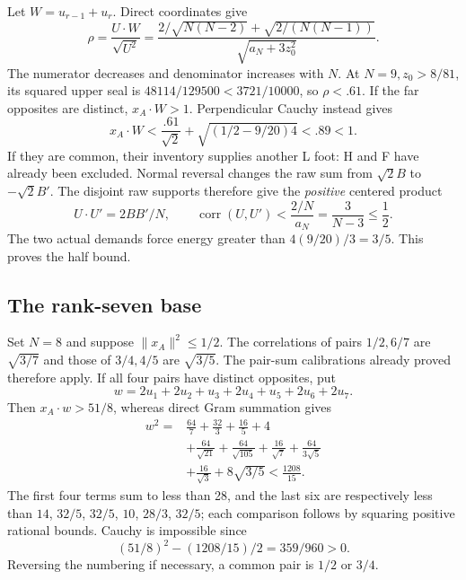 \documentclass[11pt]{article}
\theoremstyle{definition}
\theoremstyle{remark}
\begin{document}
Let \(W=u_{r-1}+u_r\). Direct coordinates give
\begin{equation}\label{app:eq:rho}
 \rho=\frac{U\cdot W}{\sqrt{U^2}}
 =\frac{2/\sqrt{N(N-2)}+\sqrt{2/(N(N-1))}}
        {\sqrt{a_N+3z_0^2}} .
\end{equation}
The numerator decreases and denominator increases with \(N\).
At \(N=9,z_0>8/81\), its squared upper seal is
\(48114/129500<3721/10000\), so \(\rho<.61\).
If the far opposites are distinct, \(x_A\cdot W>1\).
Perpendicular Cauchy instead gives
\[
 x_A\cdot W<\frac{.61}{\sqrt2}
              +\sqrt{(1/2-9/20)4}<.89<1.
\]
If they are common, their inventory supplies another L foot:
H and F have already been excluded. Normal reversal changes
the raw sum from \(\sqrt2 B\) to \(-\sqrt2 B'\).
The disjoint raw supports therefore give the \emph{positive}
centered product
\[
 U\cdot U'=2BB'/N,\qquad
 \operatorname{corr}(U,U')<\frac{2/N}{a_N}
                 =\frac3{N-3}\le\frac12.
\]
The two actual demands force energy greater than
\(4(9/20)/3=3/5\). This proves the half bound.


\subsection{The rank-seven base}\label{app:A7base}

Set $N=8$ and suppose $\|x_A\|^2\le1/2$. The correlations of
pairs $1/2,6/7$ are $\sqrt{3/7}$ and those of $3/4,4/5$ are
$\sqrt{3/5}$. The pair-sum calibrations already proved therefore
apply. If all four pairs have distinct opposites, put
\[
 w=2u_1+2u_2+u_3+2u_4+u_5+2u_6+2u_7.
\]
Then $x_A\cdot w>51/8$, whereas direct Gram summation gives
\begin{align*}
 w^2={}&\frac{64}7+\frac{32}3+\frac{16}5+4
 \\
 &+\frac{64}{\sqrt{21}}+\frac{64}{\sqrt{105}}
 +\frac{16}{\sqrt7}+\frac{64}{3\sqrt5}\\
 &+\frac{16}{\sqrt3}+8\sqrt{3/5}<\frac{1208}{15}.
\end{align*}
The first four terms sum to less than 28, and the last six are
respectively less than $14$, $32/5$, $32/5$, $10$, $28/3$, $32/5$; each comparison
follows by squaring positive rational bounds. Cauchy is impossible
since
\[
(51/8)^2-(1208/15)/2=359/960>0.
\]
Reversing the numbering
if necessary, a common pair is $1/2$ or $3/4$.
\end{document}
